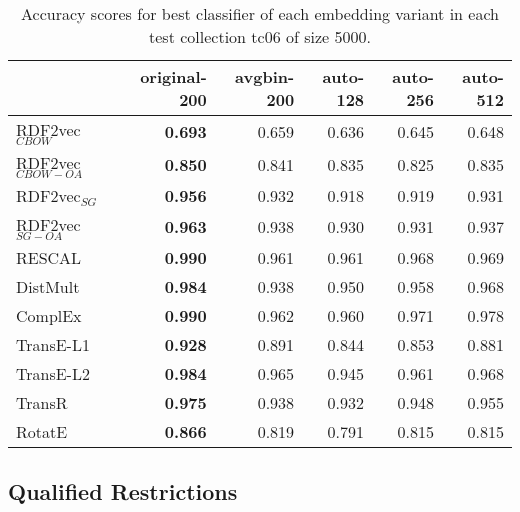\documentclass[11pt,titlepage,oneside,openany]{book}
\begin{document}
\begin{table}[h!]
\centering
\begin{tabular}{lrrrrr}
\toprule
{} &  original-200 &  avgbin-200 &  auto-128 &  auto-256 &  auto-512 \\
\midrule
RDF2vec$_{CBOW}$     &	\textbf{0.693} &       0.659  &     0.636  &     0.645  &     0.648  \\
RDF2vec$_{CBOW-OA}$  &	\textbf{0.850} &       0.841  &     0.835  &     0.825  &     0.835  \\
RDF2vec$_{SG}$       &	\textbf{0.956} &       0.932  &     0.918  &     0.919  &     0.931  \\
RDF2vec$_{SG-OA}$    &	\textbf{0.963} &       0.938  &     0.930  &     0.931  &     0.937  \\
RESCAL               &	\textbf{0.990} &       0.961  &     0.961  &     0.968  &     0.969  \\
DistMult             &	\textbf{0.984} &       0.938  &     0.950  &     0.958  &     0.968  \\
ComplEx              &	\textbf{0.990} &       0.962  &     0.960  &     0.971  &     0.978  \\
TransE-L1            &	\textbf{0.928} &       0.891  &     0.844  &     0.853  &     0.881  \\
TransE-L2            &	\textbf{0.984} &       0.965  &     0.945  &     0.961  &     0.968  \\
TransR               &	\textbf{0.975} &       0.938  &     0.932  &     0.948  &     0.955  \\
RotatE               &	\textbf{0.866} &       0.819  &     0.791  &     0.815  &     0.815  \\
\bottomrule
\end{tabular}
\caption{Accuracy scores for best classifier of each embedding variant in each test collection tc06 of size 5000.}
\label{tab:dlcc-acc-tc06-5000}
\end{table}

\newpage

\subsection{Qualified Restrictions}
\label{subsec:dlcc-results-tc07-tc08}
\end{document}
